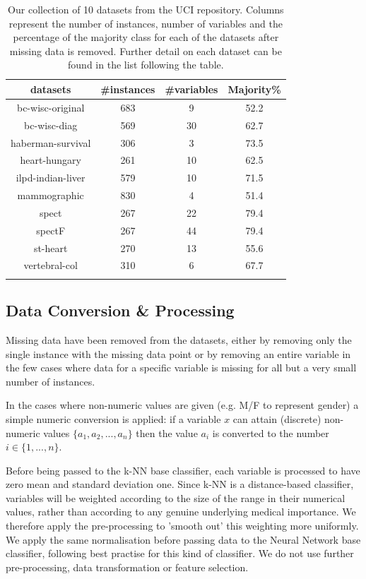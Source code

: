\documentclass{bioinfo}
\begin{document}
\begin{methods}
\begin{table}[b]
\centering
\caption{Our collection of 10 datasets from the UCI repository. Columns represent the number of instances, number of variables and the percentage of the majority class for each of the datasets after missing data is removed. Further detail on each dataset can be found in the list following the table.}
\begin{tabular*}{8cm} {@{}c @{\extracolsep{\fill}} ccc@{}}
\toprule
datasets        & \#instances  &\#variables & Majority\%\\
\midrule
bc-wisc-original&       683    &   9        &   52.2\\ 
bc-wisc-diag    &       569    &   30       &   62.7\\ 
haberman-survival&      306    &   3        &   73.5\\
heart-hungary   &       261    &   10       &   62.5\\
ilpd-indian-liver&      579    &   10       &   71.5\\
mammographic    &       830    &   4        &   51.4\\
spect           &       267    &   22       &   79.4\\
spectF          &       267    &   44       &   79.4\\
st-heart        &       270    &   13       &   55.6\\
vertebral-col   &       310    &   6        &   67.7\\
\botrule
\end{tabular*}
\label{table:datasets}
\end{table}

\subsection{Data Conversion \& Processing}

Missing data have been removed from the datasets, either by removing only the single instance with the missing data point or by removing an entire variable in the few cases where data for a specific variable is missing for all but a very small number of instances.

In the cases where non-numeric values are given (e.g. M/F to represent gender) a simple numeric conversion is applied: if a variable $x$ can attain (discrete) non-numeric values $\{a_{1}, a_{2}, ..., a_{n}\}$ then the value $a_{i}$ is converted to the number $i \in \{1,...,n\}$.

Before being passed to the k-NN base classifier, each variable is processed to have zero mean and standard deviation one. Since k-NN is a distance-based classifier, variables will be weighted according to the size of the range in their numerical values, rather than according to any genuine underlying medical importance. We therefore apply the pre-processing to 'smooth out' this weighting more uniformly. We apply the same normalisation before passing data to the Neural Network base classifier, following best practise for this kind of classifier. We do not use further pre-processing, data transformation or feature selection.



\end{methods}
\end{document}
